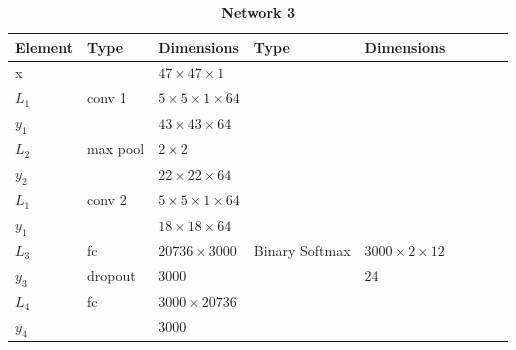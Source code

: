     \begin{table}[h!]
    \centering
    \caption*{{\bf \large Network 3}}
    {\footnotesize
    \begin{tabular}{|lllllllll|}
    \hline
    \multicolumn{1}{|l|}{Element} & Type     & \multicolumn{1}{l|}{Dimensions}                     & Type     & \multicolumn{1}{l|}{Dimensions}  \\ \hline
    \multicolumn{1}{|l|}{x}       &          & \multicolumn{1}{l|}{$47\times47\times1$}            &          & \multicolumn{1}{l|}{}        \\ \hline

    \multicolumn{1}{|l|}{$L_1$}   & conv 1   & \multicolumn{1}{l|}{$5\times 5\times1\times 64$}    &          & \multicolumn{1}{l|}{}\\
    \multicolumn{1}{|l|}{$y_1$}   &          & \multicolumn{1}{l|}{$43\times43\times64$}           &          & \multicolumn{1}{l|}{}        \\ \hline

    \multicolumn{1}{|l|}{$L_2$}   & max pool & \multicolumn{1}{l|}{$2\times 2$}                    &          & \multicolumn{1}{l|}{}        \\
    \multicolumn{1}{|l|}{$y_2$}   &          & \multicolumn{1}{l|}{$22\times22\times 64$}          &          & \multicolumn{1}{l|}{}        \\ \hline

    \multicolumn{1}{|l|}{$L_1$}   & conv 2   & \multicolumn{1}{l|}{$5\times 5\times1\times 64$}    &          & \multicolumn{1}{l|}{}\\
    \multicolumn{1}{|l|}{$y_1$}   &          & \multicolumn{1}{l|}{$18\times18\times64$}           &          & \multicolumn{1}{l|}{}        \\ \hline

    \multicolumn{1}{|l|}{$L_3$}   & fc       & \multicolumn{1}{l|}{$20736\times3000$}              & Binary Softmax & \multicolumn{1}{l|}{$3000\times2\times12$}        \\
    \multicolumn{1}{|l|}{$y_3$}   & dropout  & \multicolumn{1}{l|}{$3000$}                         &          & \multicolumn{1}{l|}{$24$}        \\ \hline

    \multicolumn{1}{|l|}{$L_4$}   & fc       & \multicolumn{1}{l|}{$3000\times20736$}              &          & \multicolumn{1}{l|}{}        \\
    \multicolumn{1}{|l|}{$y_4$}   &          & \multicolumn{1}{l|}{$3000$}                         &          & \multicolumn{1}{l|}{}        \\ \hline


\end{tabular}}
\end{table}
